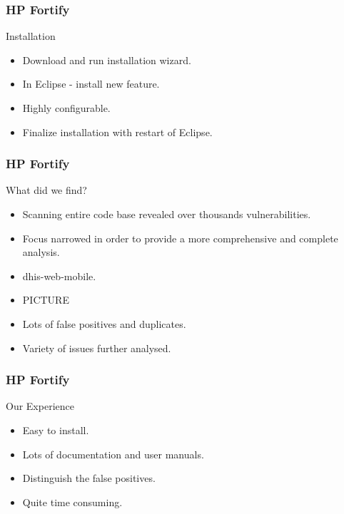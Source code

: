 \documentclass[12pt,norsk]{beamer}
\begin{document}
\begin{frame}
	
	\frametitle{HP Fortify}
	
	\begin{block}{Installation}
	
		\begin{itemize}
			\item Download and run installation wizard.
			\item In Eclipse - install new feature.
			\item Highly configurable.
			\item Finalize installation with restart of Eclipse.
		 
		\end{itemize}				
	\end{block}
\end{frame}

\begin{frame}
	
	\frametitle{HP Fortify}
	
	\begin{block}{What did we find?}
	
		\begin{itemize}
		\item Scanning entire code base revealed over thousands vulnerabilities.
		\item Focus narrowed in order to provide a more comprehensive and complete analysis.
		\item dhis-web-mobile.
		\item PICTURE
		\item Lots of false positives and duplicates.
		\item Variety of issues further analysed.
		\end{itemize}				
	\end{block}
\end{frame}

\begin{frame}
	
	\frametitle{HP Fortify}
	
	\begin{block}{Our Experience}
	
		\begin{itemize}
		\item Easy to install.
		\item Lots of documentation and user manuals.
		\item Distinguish the false positives.
		\item Quite time consuming.
		\end{itemize}				
	\end{block}
\end{frame}
\end{document}
